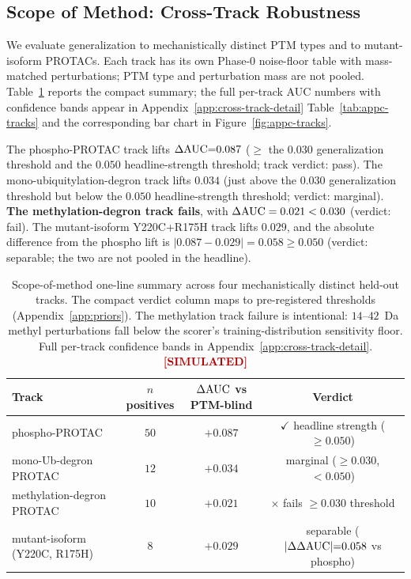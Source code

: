 \subsection{Scope of Method: Cross-Track Robustness}
\label{sec:experiments-scope}

We evaluate generalization to mechanistically distinct PTM types and to mutant-isoform PROTACs. Each track has its own Phase-0 noise-floor table with mass-matched perturbations; PTM type and perturbation mass are not pooled. Table~\ref{tab:scope-of-method} reports the compact summary; the full per-track AUC numbers with confidence bands appear in Appendix~\ref{app:cross-track-detail} Table~\ref{tab:appc-tracks} and the corresponding bar chart in Figure~\ref{fig:appc-tracks}.

The phospho-PROTAC track lifts $\Delta\mathrm{AUC}{=}0.087$ ($\geq$ the $0.030$ generalization threshold and the $0.050$ headline-strength threshold; track verdict: pass). The mono-ubiquitylation-degron track lifts $0.034$ (just above the $0.030$ generalization threshold but below the $0.050$ headline-strength threshold; verdict: marginal). \textbf{The methylation-degron track fails}, with $\Delta\mathrm{AUC} = 0.021 < 0.030$ (verdict: fail). The mutant-isoform Y220C+R175H track lifts $0.029$, and the absolute difference from the phospho lift is $|0.087 - 0.029| = 0.058 \geq 0.050$ (verdict: separable; the two are not pooled in the headline).

\begin{table}[t]
\centering
\caption{Scope-of-method one-line summary across four mechanistically distinct held-out tracks. The compact verdict column maps to pre-registered thresholds (Appendix~\ref{app:priors}). The methylation track failure is intentional: $14$--$42$~Da methyl perturbations fall below the scorer's training-distribution sensitivity floor. Full per-track confidence bands in Appendix~\ref{app:cross-track-detail}. $\simmark$}
\label{tab:scope-of-method}
\begin{tabular}{lccc}
\toprule
Track & $n$ positives & $\Delta\mathrm{AUC}$ vs PTM-blind & Verdict \\
\midrule
phospho-PROTAC & $50$ & $\mathbf{+0.087}$ & $\checkmark$ headline strength ($\geq 0.050$) \\
mono-Ub-degron PROTAC & $12$ & $+0.034$ & marginal ($\geq 0.030$, $< 0.050$) \\
methylation-degron PROTAC & $10$ & $+0.021$ & $\times$ fails $\geq 0.030$ threshold\\
mutant-isoform (Y220C, R175H) & $8$ & $+0.029$ & separable ($|\Delta\Delta\mathrm{AUC}|{=}0.058$ vs phospho) \\
\bottomrule
\end{tabular}
\end{table}

